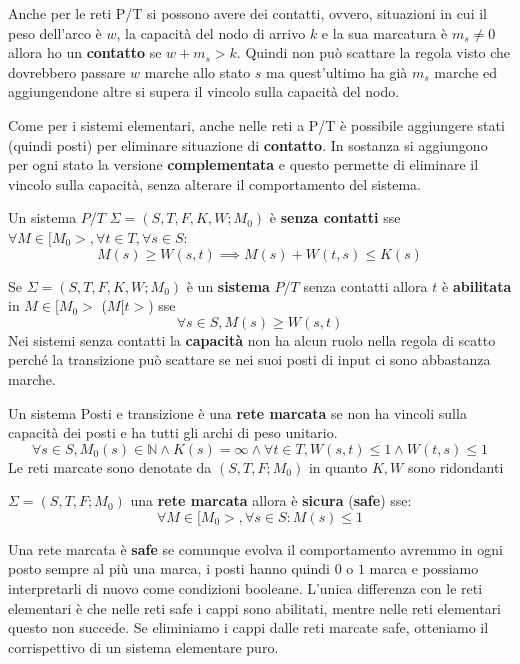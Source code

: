 Anche per le reti P/T si possono avere dei contatti, ovvero, situazioni in cui
il peso dell'arco è $w$, la capacità del nodo di arrivo $k$ e la sua marcatura è
$m_s\ne 0$ allora ho un \textbf{contatto} se $w+m_s >k$. Quindi non può scattare
la regola visto che dovrebbero passare $w$ marche allo stato $s$ ma quest'ultimo
ha già $m_s$ marche ed aggiungendone altre si supera il vincolo sulla capacità
del nodo.

Come per i sistemi elementari, anche nelle reti a P/T è possibile aggiungere stati (quindi posti)
per eliminare situazione di \textbf{contatto}. In sostanza si aggiungono per ogni
stato la versione \textbf{complementata} e questo permette di eliminare il vincolo sulla capacità,
senza alterare il comportamento del sistema.
\begin{definizione}
    Un sistema $P/T$ $\Sigma = (S,T,F,K,W;M_0)$ è \textbf{senza contatti} sse
    $\forall M\in [M_0>,\forall t\in T, \forall s\in S$:
    \begin{equation}
        M(s)\ge W(s,t)\implies M(s)+W(t,s)\le K(s)
    \end{equation}
\end{definizione}
Se $\Sigma = (S,T,F,K,W;M_0)$ è un \textbf{sistema} $P/T$ senza contatti allora
$t$ è \textbf{abilitata} in $M\in [M_0>$ ($M[t>$) sse
\begin{equation}
    \forall s\in S, M(s)\ge W(s,t)
\end{equation}
Nei sistemi senza contatti la \textbf{capacità} non ha alcun ruolo nella regola
di scatto perché la transizione può scattare se nei suoi posti di input ci sono
abbastanza marche.
\begin{definizione}
    Un sistema Posti e transizione è una \textbf{rete marcata} se non ha vincoli sulla
    capacità dei posti e ha tutti gli archi di peso unitario.
    \begin{equation}
        \forall s\in S, M_0(s)\in \mathbb{N}\land K(s)=\infty \land \forall t\in
        T, W(s,t)\le 1\land W(t,s)\le 1
    \end{equation}
    Le reti marcate sono denotate da $(S,T,F;M_0)$ in quanto $K,W$ sono ridondanti
\end{definizione}

\begin{definizione} 
    $\Sigma = (S,T,F;M_0)$ una \textbf{rete marcata} allora è \textbf{sicura}
    (\textbf{safe}) sse:
    \begin{equation}
        \forall M\in [M_0>,\forall s\in S:M(s)\le1
    \end{equation}
\end{definizione}
Una rete marcata è \textbf{safe} se comunque evolva il comportamento avremmo in
ogni posto sempre al più una marca, i posti hanno quindi $0$ o $1$ marca e possiamo
interpretarli di nuovo come condizioni booleane. L'unica differenza con le reti
elementari è che nelle reti safe i cappi sono abilitati, mentre nelle reti
elementari questo non succede. Se eliminiamo i cappi dalle reti marcate safe,
otteniamo il corrispettivo di un sistema elementare puro.

